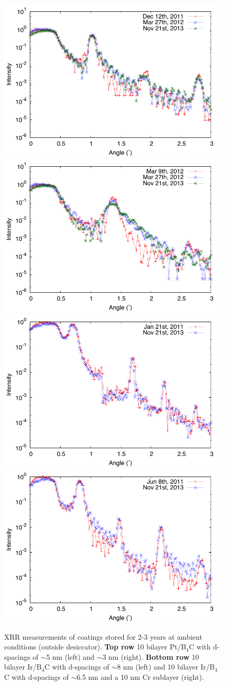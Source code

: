 \begin{figure}[htbp]
  \center  \includegraphics[width=0.47\linewidth]{figures/athena/coatings/pt-b4c-kalib2.pdf}  \includegraphics[width=0.47\linewidth]{figures/athena/coatings/pt-b4c-kalib1.pdf}
  \includegraphics[width=0.47\linewidth]{figures/athena/coatings/ir-b4c.pdf}  \includegraphics[width=0.47\linewidth]{figures/athena/coatings/ir-b4c-w-cr.pdf}
\caption{\footnotesize XRR measurements of coatings stored for 2-3 years at ambient conditions (outside desiccator).  \textbf{Top row} 10 bilayer Pt/B$_4$C with d-spacings of $\sim$5 nm (left) and $\sim$3 nm (right). \textbf{Bottom row} 10 bilayer Ir/B$_4$C with d-spacings of $\sim$8 nm (left) and 10 bilayer Ir/B$_4$C with d-spacings of $\sim$6.5 nm and a 10 nm Cr sublayer (right). }\label{fig:longtermstorage}
\end{figure}

